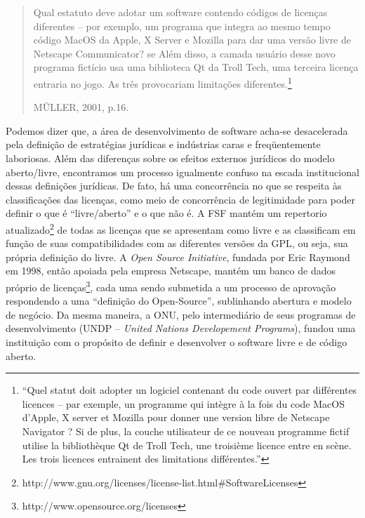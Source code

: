 \begin{quote}
Qual estatuto deve adotar um software contendo códigos de licenças diferentes – por exemplo, um programa que integra ao mesmo tempo código MacOS da Apple, X Server e Mozilla para dar uma versão livre de Netscape Communicator? se Além disso, a camada usuário desse novo programa fictício usa uma biblioteca Qt da Troll Tech, uma terceira licença entraria no jogo. As três provocariam limitações diferentes.\footnote{“Quel statut doit adopter un logiciel contenant du code ouvert par différentes licences – par exemple, un programme qui intègre à la fois du code MacOS d'Apple, X server et Mozilla pour donner une version libre de Netscape Navigator ? Si de plus, la couche utilisateur de ce nouveau programme fictif utilise la bibliothèque Qt de Troll Tech, une troisième licence entre en scène. Les trois licences entrainent des limitations différentes.”}
\begin{flushright}
MÜLLER, 2001, p.16.
\end{flushright}
\end{quote}

Podemos dizer que, a área de desenvolvimento de software acha-se desacelerada pela definição de estratégias jurídicas e indústrias caras e freqüentemente laboriosas. Além das diferenças sobre os efeitos externos jurídicos do modelo aberto/livre, encontramos um processo igualmente confuso na escada institucional dessas definições jurídicas. De fato, há uma concorrência no que se respeita às classificações das licenças, como meio de concorrência de legitimidade para poder definir o que é “livre/aberto” e o que não é. A FSF mantém um repertorio atualizado\footnote{http://www.gnu.org/licenses/license-list.html\#SoftwareLicenses} de todas as licenças que se apresentam como livre e as classificam em função de suas compatibilidades com as diferentes versões da GPL, ou seja, sua própria definição do livre. A \emph{Open Source Initiative}, fundada por Eric Raymond em 1998, então apoiada pela empresa Netscape, mantém um banco de dados próprio de licenças\footnote{http://www.opensource.org/licenses}, cada uma sendo submetida a um processo de aprovação respondendo a uma “definição do Open-Source”, sublinhando abertura e modelo de negócio. Da mesma maneira, a ONU, pelo intermediário de seus programas de desenvolvimento (UNDP – \emph{United Nations Developement Programs}), fundou uma instituição com o propósito de definir e desenvolver o software livre e de código aberto. 

